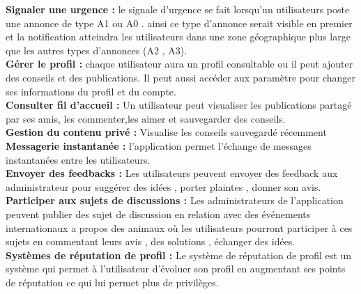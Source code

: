 \documentclass[11pt,a4paper,oneside]{book}
\begin{document}
	\textbf{Signaler une urgence : } le signale d’urgence se fait lorsqu’un utilisateurs poste une annonce de type A1 ou A0 . ainsi ce type d’annonce serait visible en premier et la notification atteindra les utilisateurs dans une zone géographique plus large que les autres types d’annonces (A2 , A3).\\
	
	\textbf{Gérer le profil :} chaque utilisateur aura un profil consultable ou il peut ajouter des conseils et des publications.
	Il peut aussi accéder aux paramètre pour changer ses informations du profil et du compte.\\
	
	\textbf{Consulter fil d'accueil :} 
	Un utilisateur peut visualiser les publications partagé par ses amis, les commenter,les aimer et sauvegarder des conseils.\\
	
	\textbf{Gestion du contenu privé :} Visualise les conseils sauvegardé récemment  \\
	
	\textbf{Messagerie instantanée :} l’application permet l'échange de messages instantanées entre les utilisateurs.\\
	
	\textbf{Envoyer des feedbacks :} 
	Les utilisateurs peuvent envoyer des feedback aux administrateur pour suggérer des idées ,  porter plaintes , donner son avis.\\
	
	\textbf{Participer aux sujets de discussions :} Les administrateurs de l’application peuvent publier des sujet de discussion en relation avec des événements internationaux a propos des animaux où les utilisateurs pourront participer à ces sujets en commentant leurs avis , des solutions , échanger des idées.\\
	
	\textbf{Systèmes de réputation de profil :} Le système de réputation de profil est un système qui permet à l’utilisateur d'évoluer son profil en augmentant ses points de réputation ce qui lui permet plus de privilèges.\\
	
\end{document}
